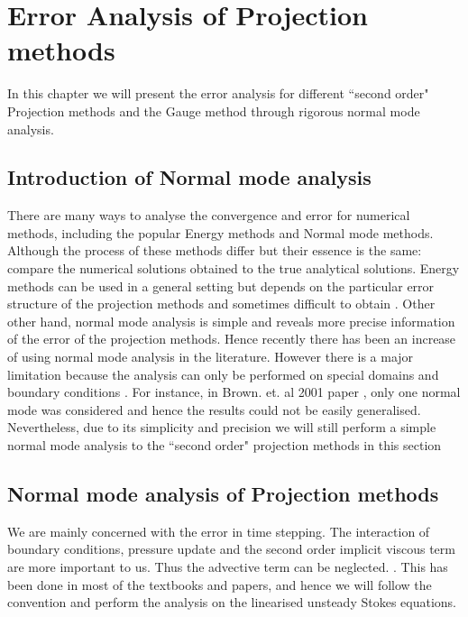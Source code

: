 
\chapter{Error Analysis of Projection methods}
\label{chapter5}
In this chapter we will present the error analysis for different ``second order" Projection methods and the Gauge method through rigorous normal mode analysis.

\section{Introduction of Normal mode analysis}

There are many ways to analyse the convergence and error for numerical methods, including the popular Energy methods \cite{liu1996projection,guermond2006overview} and Normal mode methods. Although the process of these methods differ but their essence is the same: compare the numerical solutions obtained to the true analytical solutions\cite{pyo2005normal,guermond2004error}. Energy methods can be used in a general setting but depends on the particular error structure of the projection methods and sometimes difficult to obtain \cite{guermond2006overview}. Other other hand, normal mode analysis is simple and reveals more precise information of the error of the projection methods. Hence recently there has been an increase of using normal mode analysis in the literature. However there is a major limitation because the analysis can only be performed on special domains and boundary conditions \cite{strikwerda1999accuracy,pyo2005normal,brown2001accurate}. For instance, in Brown. et. al 2001 paper \cite{brown2001accurate}, only one normal mode was considered and hence the results could not be easily generalised.\\
Nevertheless, due to its simplicity and precision we will still perform a simple normal mode analysis to the ``second order" projection methods in this section

\section{Normal mode analysis of Projection methods}
We are mainly concerned with the error in time stepping. The interaction of boundary conditions, pressure update and the second order implicit viscous term are more important to us. Thus the advective term can be neglected. \cite{brown2001accurate,strikwerda1999accuracy,pyo2005normal,guermond2004error,liu1996projection,shen1996error,shen1992error}. This has been done in most of the textbooks and papers, and hence we will follow the convention and perform the analysis on the linearised unsteady Stokes equations.\\

